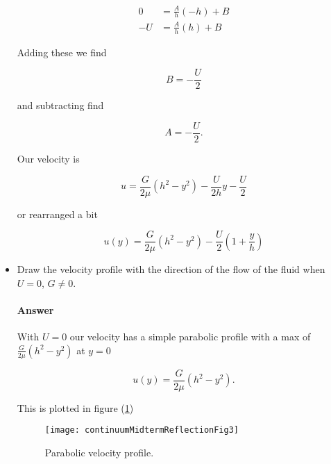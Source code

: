\begin{itemize}
\begin{align}\label{eqn:continuumMidTermReflection:550}
0 &= \frac{A}{h} (-h) + B \\
-U &= \frac{A}{h} (h) + B
\end{align}

Adding these we find

\begin{equation}\label{eqn:continuumMidTermReflection:570}
B = -\frac{U}{2}
\end{equation}

and subtracting find

\begin{equation}\label{eqn:continuumMidTermReflection:590}
A = -\frac{U}{2}.
\end{equation}

Our velocity is

\begin{equation}\label{eqn:continuumMidTermReflection:610}
u = \frac{G}{2 \mu} (h^2 - y^2) - \frac{U}{2 h} y -\frac{U}{2}
\end{equation}

or rearranged a bit

\begin{equation}\label{eqn:continuumMidTermReflection:630}
\boxed{
u(y) = \frac{G}{2 \mu} (h^2 - y^2) - \frac{U}{2} \left( 1 + \frac{y}{h} \right)
}
\end{equation}

\item Draw the velocity profile with the direction of the flow of the fluid when $U = 0$, $G \ne 0$.

\paragraph{Answer}

With $U = 0$ our velocity has a simple parabolic profile with a max of $\frac{G}{2 \mu} (h^2 - y^2)$ at $y = 0$

\begin{equation}\label{eqn:continuumMidTermReflection:650}
u(y) = \frac{G}{2 \mu} (h^2 - y^2).
\end{equation}

This is plotted in figure (\ref{fig:continuumMidtermReflection:continuumMidtermReflectionFig3})
\begin{figure}[htp]
   \centering
   \texttt{[image: continuumMidtermReflectionFig3]}
   \caption{Parabolic velocity profile.}\label{fig:continuumMidtermReflection:continuumMidtermReflectionFig3}
\end{figure}


\end{itemize}

